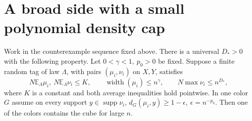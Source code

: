 \section{A broad side with a small polynomial density cap}
\label{sec:very-small-polynomial-width-on-the-broad-side-polynomial-defect}

\begin{lemma}
\label{lem:small-polynomial-broad-side}
Work in the counterexample sequence fixed above. There is a universal \(D_*>0\) with the following property. Let \(0<\gamma<1,\ p_0>0\) be fixed. Suppose a finite random tag of law \(\Lambda\), with pairs \((\mu_i,\nu_i)\) on \(X,Y\), satisfies
\[
 N\mathbb E_\Lambda\mu_i,\ N\mathbb E_\Lambda\nu_i\le K,\qquad
 \operatorname{width}(\mu_i)\le n^\gamma,\qquad N\max\nu_i\le n^{D_*},
\]
where \(K\) is a constant and both average inequalities hold pointwise. In one color \(G\) assume on every support \(y\in\operatorname{supp}\nu_i\), \(d_G(\mu_i,y)\ge1-\epsilon,\ \epsilon=n^{-p_0}\). Then one of the colors contains the cube for large \(n\).
\end{lemma}

